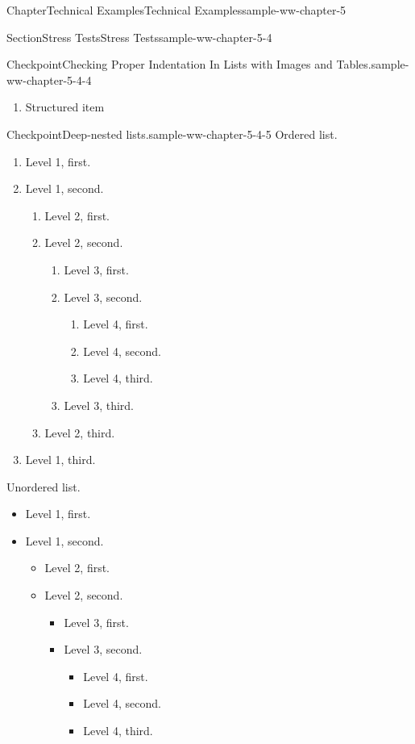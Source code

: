 \documentclass[oneside,10pt,]{book}
\numberwithin{equation}{section}
\begin{document}
\begin{chapterptx}{Chapter}{Technical Examples}{}{Technical Examples}{}{}{sample-ww-chapter-5}
\begin{sectionptx}{Section}{Stress Tests}{}{Stress Tests}{}{}{sample-ww-chapter-5-4}
\begin{inlineexercise}{Checkpoint}{Checking Proper Indentation In Lists with Images and Tables.}{sample-ww-chapter-5-4-4}
\begin{enumerate}[label={\alph*.}]
\item{}Structured item%
\end{enumerate}
%
\end{inlineexercise}%
\begin{inlineexercise}{Checkpoint}{Deep-nested lists.}{sample-ww-chapter-5-4-5}%
Ordered list.%
\par
%
\begin{enumerate}[label={\alph*.}]
\item{}Level 1, first.%
\item{}Level 1, second.%
\begin{enumerate}[label={\roman*.}]
\item{}Level 2, first.%
\item{}Level 2, second.%
\begin{enumerate}[label={\Alph*.}]
\item{}Level 3, first.%
\item{}Level 3, second.%
\begin{enumerate}[label={\arabic*.}]
\item{}Level 4, first.%
\item{}Level 4, second.%
\item{}Level 4, third.%
\end{enumerate}
%
\item{}Level 3, third.%
\end{enumerate}
%
\item{}Level 2, third.%
\end{enumerate}
%
\item{}Level 1, third.%
\end{enumerate}
%
\par
Unordered list.%
\par
%
\begin{itemize}[label=\textbullet]
\item{}Level 1, first.%
\item{}Level 1, second.%
\begin{itemize}[label=$\circ$]
\item{}Level 2, first.%
\item{}Level 2, second.%
\begin{itemize}[label=$\blacksquare$]
\item{}Level 3, first.%
\item{}Level 3, second.%
\begin{itemize}[label=\textbullet]
\item{}Level 4, first.%
\item{}Level 4, second.%
\item{}Level 4, third.%

\end{itemize}
\end{itemize}
\end{itemize}
\end{itemize}
\end{inlineexercise}
\end{sectionptx}
\end{chapterptx}
\end{document}
